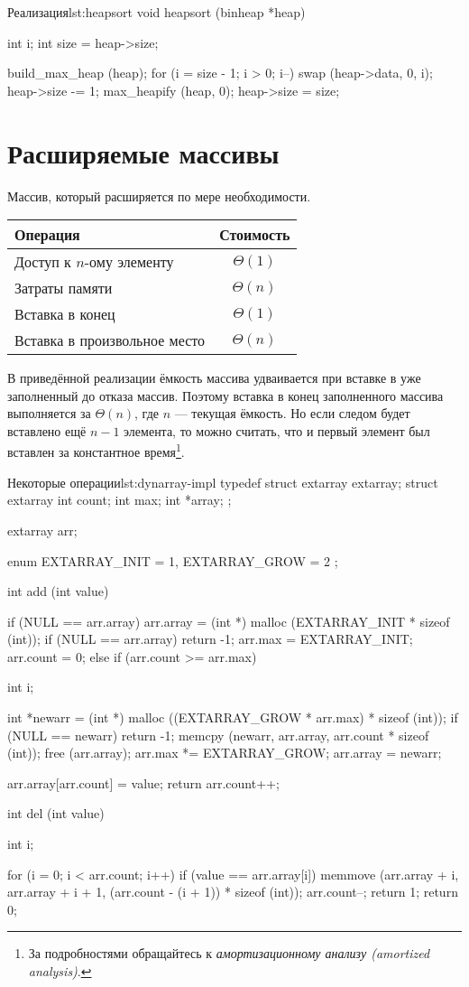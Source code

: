 \begin{clst}{Реализация}{lst:heapsort}
void heapsort (binheap *heap) {
  int i;
  int size = heap->size;

  build_max_heap (heap);
  for (i = size - 1; i > 0; i--) {
    swap (heap->data, 0, i);
    heap->size -= 1;
    max_heapify (heap, 0);
  }
  heap->size = size;
}
\end{clst}

\section{Расширяемые массивы}
\label{sec:ext-arrays}

Массив, который расширяется по мере необходимости.
\begin{center}
  \begin{tabular}{lc}
    \toprule
    Операция & Стоимость \\
    \midrule
    Доступ к $n$-ому элементу & $\Theta(1)$ \\
    Затраты памяти & $\Theta(n)$ \\
    Вставка в конец & $\Theta(1)$ \\
    Вставка в произвольное место & $\Theta(n)$ \\
    \bottomrule
  \end{tabular}
\end{center}

В приведённой реализации ёмкость массива удваивается при вставке в уже заполненный до отказа массив. Поэтому вставка в конец заполненного массива выполняется за $\Theta(n)$, где $n$ — текущая ёмкость. Но если следом будет вставлено ещё $n - 1$ элемента, то можно считать, что и первый элемент был вставлен за константное время\footnote{За подробностями обращайтесь к \emph{амортизационному анализу (amortized analysis)}.}.

\begin{clst}{Некоторые операции}{lst:dynarray-impl}
typedef struct extarray extarray;
struct extarray {
  int count;
  int max;
  int *array;
};

extarray arr;

enum { EXTARRAY_INIT = 1,
       EXTARRAY_GROW = 2 };

int add (int value) {
  if (NULL == arr.array) {
    arr.array = (int *) malloc (EXTARRAY_INIT * sizeof (int));
    if (NULL == arr.array)
      return -1;
    arr.max = EXTARRAY_INIT;
    arr.count = 0;
  } else if (arr.count >= arr.max) {
    int i;

    int *newarr = (int *) malloc ((EXTARRAY_GROW * arr.max) * sizeof (int));
    if (NULL == newarr)
      return -1;
    memcpy (newarr, arr.array, arr.count * sizeof (int));
    free (arr.array);
    arr.max *= EXTARRAY_GROW;
    arr.array = newarr;
  }
  arr.array[arr.count] = value;
  return arr.count++;
}

int del (int value) {
  int i;

  for (i = 0; i < arr.count; i++)
    if (value == arr.array[i]) {
      memmove (arr.array + i, arr.array + i + 1,
	       (arr.count - (i + 1)) * sizeof (int));
      arr.count--;
      return 1;
    }
  return 0;
}
\end{clst}


